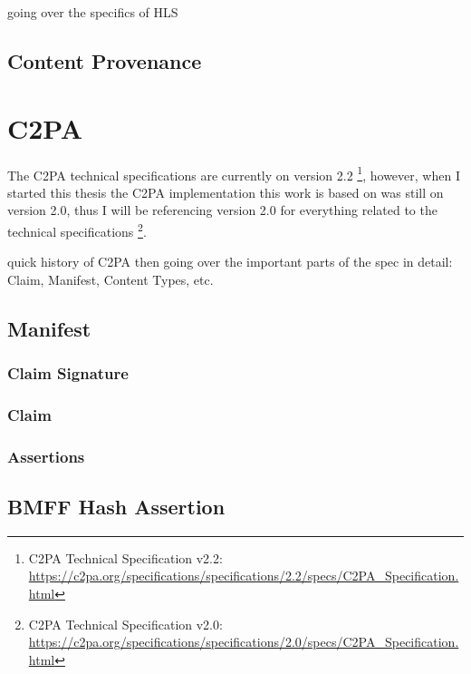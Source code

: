going over the specifics of HLS

\subsection{Content Provenance\label{sec:conpro}}

\section{C2PA\label{c2pa}}

The C2PA technical specifications are currently on version 2.2 \footnote{C2PA Technical Specification v2.2: \url{https://c2pa.org/specifications/specifications/2.2/specs/C2PA_Specification.html}}, however, when I started this thesis the C2PA implementation this work is based on was still on version 2.0, thus I will be referencing version 2.0 for everything related to the technical specifications \footnote{C2PA Technical Specification v2.0: \url{https://c2pa.org/specifications/specifications/2.0/specs/C2PA_Specification.html}}.

quick history of C2PA then going over the important parts of the spec in detail: Claim, Manifest, Content Types, etc.

\subsection{Manifest}

\subsubsection{Claim Signature}

\subsubsection{Claim}

\subsubsection{Assertions}

\subsection{BMFF Hash Assertion\label{sec:bmff_assertion}}

